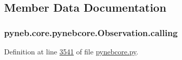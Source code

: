 \subsection{Member Data Documentation}
\hypertarget{classpyneb_1_1core_1_1pynebcore_1_1_observation_a2639fad9af4fefad20e4097295bd40e7}{
\subsubsection[{calling}]{\setlength{\rightskip}{0pt plus 5cm}pyneb.\-core.\-pynebcore.\-Observation.\-calling}}\label{classpyneb_1_1core_1_1pynebcore_1_1_observation_a2639fad9af4fefad20e4097295bd40e7}


Definition at line \hyperlink{pynebcore_8py_source_l03541}{3541} of file \hyperlink{pynebcore_8py_source}{pynebcore.\-py}.




